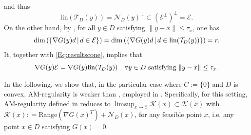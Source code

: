\documentclass[11pt,a4paper,reqno]{amsart}
\begin{document}
{and thus
\begin{equation}\label{Eq:resultscone}
  \text{lin}(\mathcal T_D(y)) =  \mathcal N_D(y)^{\perp} \subset (\mathcal E ^{\perp})^{\perp} =\mathcal E. 
\end{equation}
On the other hand, by , for all $y\in D$ satisfying $\|y-x\|\leq \tau_x$, one has
\begin{equation*}
\text{\rm dim}
\left(\{\nabla G(y)d\,|\,d\in \mathcal E\}\right)= \text{\rm dim}\left(\{\nabla G(y)d \,|\, d\in \text{\rm lin}(\mathcal T_D(y))\}\right) =r.
\end{equation*}
It, together with \eqref{Eq:resultscone}, implies that
\begin{equation}\label{Eq:result_rCRCQ}
    \nabla G(y)\mathcal E = \nabla G(y)\text{\rm lin}(\mathcal T_D(y)) \quad \forall y\in D \ \text{satisfying}\ \|y-x\|\leq \tau_x.
\end{equation}

In the following, we show that, in the particular case where $C:=\{0\}$ and $D$ is convex, AM-regularity is weaker than , employed in \cite{xiao2026exact}. Specifically, for this setting, AM-regularity defined in  reduces to
$ %
    \limsup_{x \to \bar x} \mathcal K(x) \subset \mathcal K(\bar x)
$ %
with 
$   \mathcal K (x) : = \text{Range} \left(\nabla G(x)^T\right)+\mathcal N_D(x)$,
 for any feasible point $x$, i.e, any point $x\in D$ satisfying $G(x)=0$.

}
\end{document}
